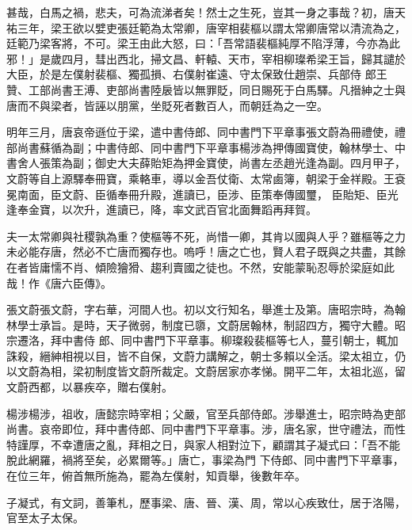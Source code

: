 
\begin{pinyinscope}

 甚哉，白馬之禍，悲夫，可為流涕者矣！然士之生死，豈其一身之事哉？初，唐天祐三年，梁王欲以嬖吏張廷範為太常卿，唐宰相裴樞以謂太常卿唐常以清流為之，廷範乃梁客將，不可。梁王由此大怒，曰：「吾常語裴樞純厚不陷浮薄，今亦為此邪！」是歲四月，彗出西北，掃文昌、軒轅、天市，宰相柳璨希梁王旨，歸其譴於大臣，於是左僕射裴樞、獨孤損、右僕射崔遠、守太保致仕趙崇、兵部侍
 郎王贊、工部尚書王溥、吏部尚書陸扆皆以無罪貶，同日賜死于白馬驛。凡搢紳之士與唐而不與梁者，皆誣以朋黨，坐貶死者數百人，而朝廷為之一空。



 明年三月，唐哀帝遜位于梁，遣中書侍郎、同中書門下平章事張文蔚為冊禮使，禮部尚書蘇循為副；中書侍郎、同中書門下平章事楊涉為押傳國寶使，翰林學士、中書舍人張策為副；御史大夫薛貽矩為押金寶使，尚書左丞趙光逢為副。四月甲子，文蔚等自上源驛奉冊寶，乘輅車，導以金吾仗衛、太常鹵簿，朝梁于金祥殿。王袞冕南面，臣文蔚、臣循奉冊升殿，進讀已，臣涉、臣策奉傳國璽，
 臣貽矩、臣光逢奉金寶，以次升，進讀已，降，率文武百官北面舞蹈再拜賀。



 夫一太常卿與社稷孰為重？使樞等不死，尚惜一卿，其肯以國與人乎？雖樞等之力未必能存唐，然必不亡唐而獨存也。嗚呼！唐之亡也，賢人君子既與之共盡，其餘在者皆庸懦不肖、傾險獪猾、趨利賣國之徒也。不然，安能蒙恥忍辱於梁庭如此哉！作《唐六臣傳》。



 張文蔚張文蔚，字右華，河間人也。初以文行知名，舉進士及第。唐昭宗時，為翰林學士承旨。是時，天子微弱，制度已隳，文蔚居翰林，制詔四方，獨守大體。昭宗遷洛，拜中書侍
 郎、同中書門下平章事。柳璨殺裴樞等七人，蔓引朝士，輒加誅殺，縉紳相視以目，皆不自保，文蔚力講解之，朝士多賴以全活。梁太祖立，仍以文蔚為相，梁初制度皆文蔚所裁定。文蔚居家亦孝悌。開平二年，太祖北巡，留文蔚西都，以暴疾卒，贈右僕射。



 楊涉楊涉，祖收，唐懿宗時宰相；父嚴，官至兵部侍郎。涉舉進士，昭宗時為吏部尚書。哀帝即位，拜中書侍郎、同中書門下平章事。涉，唐名家，世守禮法，而性特謹厚，不幸遭唐之亂，拜相之日，與家人相對泣下，顧謂其子凝式曰：「吾不能脫此網羅，禍將至矣，必累爾等。」唐亡，事梁為門
 下侍郎、同中書門下平章事，在位三年，俯首無所施為，罷為左僕射，知貢舉，後數年卒。



 子凝式，有文詞，善筆札，歷事梁、唐、晉、漢、周，常以心疾致仕，居于洛陽，官至太子太保。




\end{pinyinscope}
